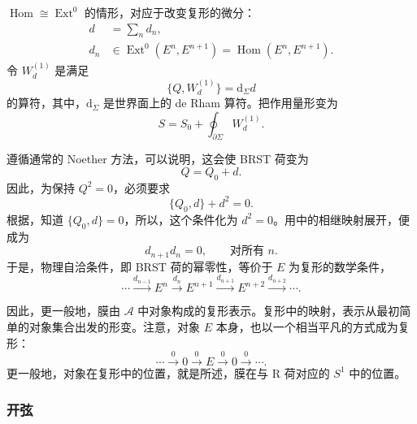 $\operatorname{Hom}\cong\operatorname{Ext}^0$ 的情形，对应于改变复形的微分：
\begin{equation}\label{eq:5.43}
\begin{aligned}
d&=\sum_n d_n,\\
d_n&\in\operatorname{Ext}^0(E^n,E^{n+1})
=\operatorname{Hom}(E^n,E^{n+1}).
\end{aligned}
\end{equation}
令 $W_d^{(1)}$ 是满足
\begin{equation}\label{eq:5.44}
\{Q,W_d^{(1)}\}=\mathrm{d}_\Sigma d
\end{equation}
的算符，其中，$\mathrm{d}_\Sigma$ 是世界面上的 de Rham 算符。把作用量形变为
\begin{equation}\label{eq:5.45}
S=S_0+\oint_{\partial\Sigma}W_d^{(1)}.
\end{equation}

遵循通常的 Noether 方法，可以说明，这会使 BRST 荷变为
\begin{equation}\label{eq:5.46}
Q=Q_0+d.
\end{equation}
因此，为保持 $Q^2=0$，必须要求
\begin{equation}\label{eq:5.47}
\{Q_0,d\}+d^2=0.
\end{equation}
根据，知道 $\{Q_0,d\}=0$，所以，这个条件化为 $d^2=0$。用中的相继映射展开，便成为
\begin{equation}\label{eq:5.48}
d_{n+1}d_n=0,\qquad\text{对所有 }n.
\end{equation}
于是，物理自洽条件，即 BRST 荷的幂零性，等价于 $E$ 为复形的数学条件，
\begin{equation}\label{eq:5.49}
\cdots\xrightarrow{d_{n-1}}E^n\xrightarrow{d_n}E^{n+1}
\xrightarrow{d_{n+1}}E^{n+2}\xrightarrow{d_{n+2}}\cdots.
\end{equation}

因此，更一般地，膜由 $\mathcal{A}$ 中对象构成的复形表示。复形中的映射，表示从最初简单的对象集合出发的形变。注意，对象 $E$ 本身，也以一个相当平凡的方式成为复形：
\begin{equation}\label{eq:5.50}
\cdots\xrightarrow{0}0\xrightarrow{0}E\xrightarrow{0}0\xrightarrow{0}\cdots.
\end{equation}
更一般地，对象在复形中的位置，就是所述，膜在与 R 荷对应的 $S^1$ 中的位置。

\subsubsection{开弦}\label{sec:5.3.2.1}

